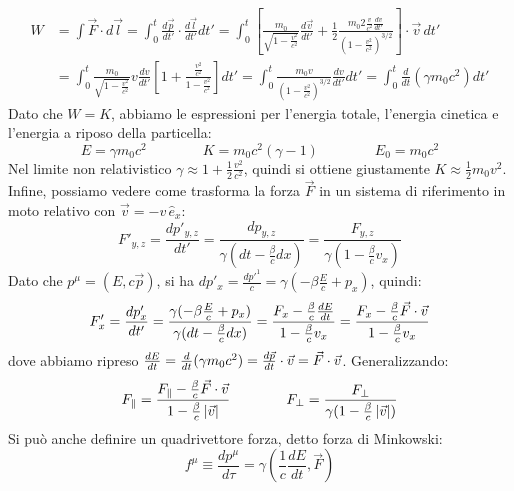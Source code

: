 \documentclass[]{article}
\begin{document}
\begin{equation}
	\begin{split}
		W &= \int \vec{F}\cdot d\vec{l} = \int_0^t \displaystyle\frac{d\vec{p}}{dt'}\cdot \displaystyle\frac{d\vec{l}}{dt'} dt' = \int_0^t \left[ \displaystyle\frac{m_0}{\sqrt{1 - \frac{v^2}{c^2}}} \displaystyle\frac{d\vec{v}}{dt'} + \frac{1}{2}\displaystyle\frac{m_0 2\frac{v}{c^2}\frac{dv}{dt'}}{\left(1 - \frac{v^2}{c^2}\right)^{3/2}} \right] \cdot\vec{v}\, dt' \\ 
		  &= \int_0^t \displaystyle\frac{m_0}{\sqrt{1-\frac{v^2}{c^2}}} v \displaystyle\frac{dv}{dt'} \left[ 1 + \displaystyle\frac{\frac{v^2}{c^2}}{1 - \frac{v^2}{c^2}}\right] dt' = \int_0^t \displaystyle\frac{m_0 v}{\left(1-\frac{v^2}{c^2}\right)^{3/2}} \displaystyle\frac{dv}{dt'} dt' = \int_0^t \displaystyle\frac{d}{dt}\left(\gamma m_0 c^2\right)dt'
	\end{split}
	\label{eq:21}
\end{equation}
Dato che $ W = K $, abbiamo le espressioni per l'energia totale, l'energia cinetica e l'energia a riposo della particella:
\begin{equation}
	E = \gamma m_0 c^2 \qquad\qquad K = m_0 c^2 (\gamma-1) \qquad\qquad E_0 = m_0 c^2
	\label{eq:22}
\end{equation}
Nel limite non relativistico $ \gamma \approx 1 + \frac{1}{2}\frac{v^2}{c^2} $, quindi si ottiene giustamente $ K \approx \frac{1}{2} m_0 v^2 $. \\ 
Infine, possiamo vedere come trasforma la forza $ \vec{F} $ in un sistema di riferimento in moto relativo con $ \vec{v} = -v\,\hat{e}_x $:
\begin{equation}
	F'_{y,z} = \displaystyle\frac{dp'_{y,z}}{dt'} = \displaystyle\frac{dp_{y,z}}{\gamma (dt - \frac{\beta}{c}dx)} = \displaystyle\frac{F_{y,z}}{\gamma (1 - \frac{\beta}{c} v_x)}
	\label{eq:23}
\end{equation}
Dato che $ p^{\mu} = (E, c\vec{p}) $, si ha $ dp'_x = \frac{dp'^1}{c} = \gamma (-\beta \frac{E}{c} + p_x) $, quindi:
\begin{equation}
	F'_x = \displaystyle\frac{dp'_x}{dt'} = \displaystyle\frac{\gamma (-\beta \frac{E}{c} + p_x)}{\gamma (dt - \frac{\beta}{c} dx)} = \displaystyle\frac{F_x - \frac{\beta}{c}\frac{dE}{dt}}{1 - \frac{\beta}{c}v_x} = \displaystyle\frac{F_x - \frac{\beta}{c}\vec{F}\cdot\vec{v}}{1 - \frac{\beta}{c} v_x}
	\label{eq:24}
\end{equation}
dove abbiamo ripreso $ \frac{dE}{dt} = \frac{d}{dt}(\gamma m_0 c^2) = \frac{d\vec{p}}{dt}\cdot\vec{v}=\vec{F}\cdot\vec{v} $. Generalizzando:
\begin{equation}
	F_{\parallel} = \displaystyle\frac{F_{\parallel} - \frac{\beta}{c}\vec{F}\cdot\vec{v}}{1 - \frac{\beta}{c} \left\lvert\vec{v}\right\rvert} \qquad\qquad F_{\perp} = \displaystyle\frac{F_{\perp}}{\gamma (1 - \frac{\beta}{c} \left\lvert\vec{v}\right\rvert)}
	\label{eq:25}
\end{equation}
Si può anche definire un quadrivettore forza, detto forza di Minkowski:
\begin{equation}
	f^{\mu} \equiv \displaystyle\frac{dp^{\mu}}{d\tau} = \gamma \left(\displaystyle\frac{1}{c}\displaystyle\frac{dE}{dt}, \vec{F}\right)
	\label{eq:26}
\end{equation}
\end{document}
